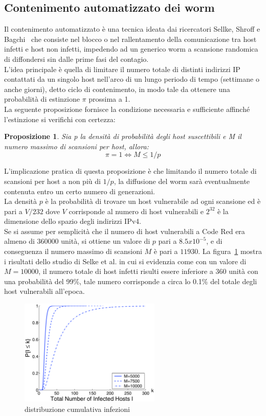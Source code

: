 \subsection{Contenimento automatizzato dei worm}
Il contenimento automatizzato è una tecnica ideata dai ricercatori Sellke, Shroff e Bagchi~\cite{selke} che consiste nel blocco o nel rallentamento della comunicazione tra host infetti e host non infetti, impedendo ad un generico worm a scansione randomica di diffondersi sin dalle prime fasi del contagio.\\
L’idea principale è quella di limitare il numero totale di distinti indirizzi IP contattati da un singolo host nell’arco di un lungo periodo di tempo (settimane o anche giorni), detto ciclo di contenimento, in modo tale da ottenere una probabilità di estinzione $\pi$ prossima a 1.\\
La seguente proposizione fornisce la condizione necessaria e sufficiente affinché l’estinzione si verifichi con certezza:\\
\newtheorem{prop}{Proposizione}
\begin{prop}
Sia p la densità di probabilità degli host suscettibili e M il numero massimo di scansioni per host, allora:
\begin{displaymath}
    \pi = 1  \Leftrightarrow  M \le 1/p 
\end{displaymath}
\end{prop}
L’implicazione pratica di questa proposizione è che limitando il numero totale di scansioni per host a non più di $1/p$, la diffusione del worm sarà eventualmente contenuta entro un certo numero di generazioni.\\
La densità $p$ è la probabilità di trovare un host vulnerabile ad ogni scansione ed è pari a $V/232$ dove $V$ corrisponde al numero di host vulnerabili e $2^{32}$ è la dimensione dello spazio degli indirizzi IPv4.\\
Se si assume per semplicità che il numero di host vulnerabili a Code Red era almeno di $360000$ unità, si ottiene un valore di $p$ pari a $8.5 x 10^{-5}$, e di conseguenza il numero massimo di scansioni $M$ è pari a $11930$.
La figura~\ref{auto} mostra i risultati dello studio di Selke et al. in cui si evidenzia come con un valore di $M = 10000$, il numero totale di host infetti risulti essere inferiore a $360$ unità con una probabilità del 99\%, tale numero corrisponde a circa lo 0.1\% del totale degli host vulnerabili all’epoca.\\
\begin{figure}[!h]
\centering
\includegraphics[width=0.6\textwidth]{images/auto.eps}
\caption{distribuzione cumulativa infezioni}
\label{auto}
\end{figure}
